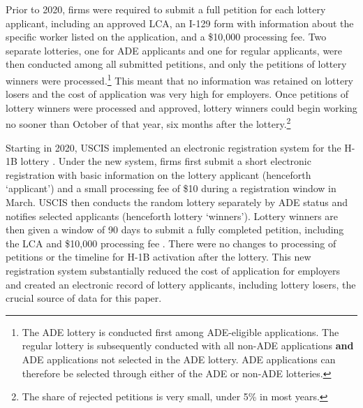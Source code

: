 Prior to 2020, firms were required to submit a full petition for each lottery applicant, including an approved LCA, an I-129 form with information about the specific worker listed on the application, and a \$10,000 processing fee. Two separate lotteries, one for ADE applicants and one for regular applicants, were then conducted among all submitted petitions, and only the petitions of lottery winners were processed.\footnote{The ADE lottery is conducted first among ADE-eligible applications. The regular lottery is subsequently conducted with all non-ADE applications \textbf{and} ADE applications not selected in the ADE lottery. ADE applications can therefore be selected through either of the ADE or non-ADE lotteries.} This meant that no information was retained on lottery losers and the cost of application was very high for employers. Once petitions of lottery winners were processed and approved, lottery winners could begin working no sooner than October of that year, six months after the lottery.\footnote{The share of rejected petitions is very small, under 5\% in most years.}

Starting in 2020, USCIS implemented an electronic registration system for the H-1B lottery \citep{uscis_h1b_registration_2020}. Under the new system, firms first submit a short electronic registration with basic information on the lottery applicant (henceforth `applicant') and a small processing fee of \$10 during a registration window in March. USCIS then conducts the random lottery separately by ADE status and notifies selected applicants (henceforth lottery `winners'). Lottery winners are then given a window of 90 days to submit a fully completed petition, including the LCA and \$10,000 processing fee \citep{uscis_h1b_fy2021_file}. There were no changes to processing of petitions or the timeline for H-1B activation after the lottery. This new registration system substantially reduced the cost of application for employers and created an electronic record of lottery applicants, including lottery losers, the crucial source of data for this paper.


